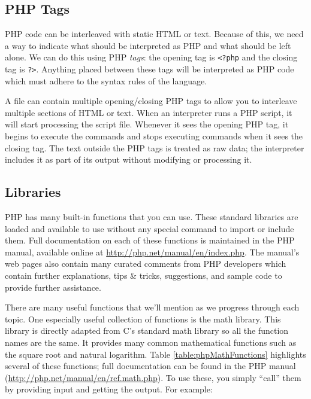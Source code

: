 \subsection{PHP Tags}

PHP code can be interleaved with static HTML or text.  Because of this, 
we need a way to indicate what should be interpreted as PHP and what
should be left alone.  We can do this using PHP \emph{tags}: the
opening tag is \texttt{<?php} and the closing tag is \texttt{?>}.
Anything placed between these tags will be interpreted as PHP code which
must adhere to the syntax rules of the language.  

A file can contain multiple opening/closing PHP tags to allow you to
interleave multiple sections of HTML or text.  When an interpreter runs
a PHP script, it will start processing the script file.  Whenever it sees the
opening PHP tag, it begins to execute the commands and stops executing
commands when it sees the closing tag.  The text outside the PHP tags is
treated as raw data; the interpreter includes it as part of its output without
modifying or processing it.

\subsection{Libraries}

PHP has many built-in functions that you can use.  These standard
libraries are loaded and available to use without any special command
to import or include them.  Full documentation on each of these
functions is maintained in the PHP manual, available online at
\url{http://php.net/manual/en/index.php}.   The manual's web
pages also contain many curated comments from PHP developers
which contain further explanations, tips \& tricks, suggestions, and
sample code to provide further assistance.  

There are many useful functions that we'll mention as we progress
through each topic.  One especially useful collection of functions is 
the math library.  This library is directly adapted from C's standard 
math library so all the function names are the same.  It provides
many common mathematical functions such as the square root and 
natural logarithm.  Table \ref{table:phpMathFunctions} highlights several of 
these functions; full documentation can be found in the PHP manual 
(\url{http://php.net/manual/en/ref.math.php}).  To use these, you 
simply ``call'' them by providing input 
and getting the output.  For example:

